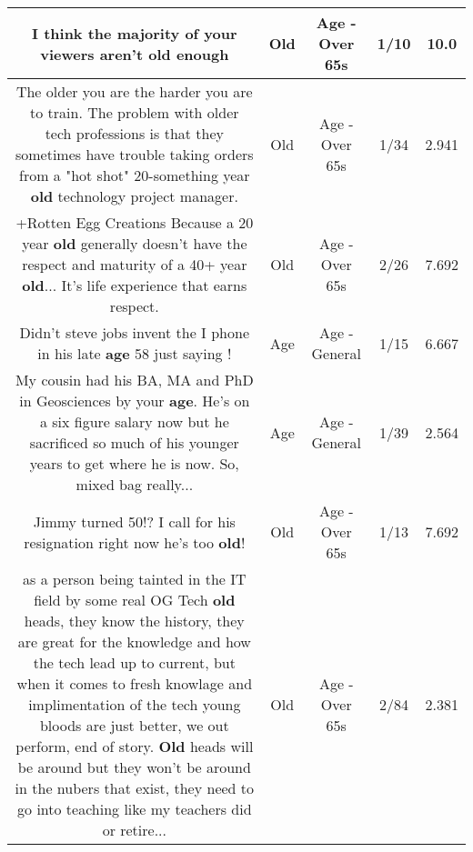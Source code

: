 \documentclass[11pt]{article}
\newlength\mylength
\begin{document}
\begin{center}
\begin{longtable}{|C{.65\mylength}|C{.30\mylength}|C{.12\mylength}|C{.12\mylength}|C{.12\mylength}|}
  \small I think the majority of your viewers aren't \textbf{old} enough\normalsize   & Old & Age - Over 65s & 1/10 & 10.0 \\  \hline
  \small The older you are the harder you are to train. The problem with older tech professions is that they sometimes have trouble taking orders from a "hot shot" 20-something year \textbf{old} technology project manager.\normalsize   & Old & Age - Over 65s & 1/34 & 2.941 \\  \hline
  \small +Rotten Egg Creations Because a 20 year \textbf{old} generally doesn't have the respect and maturity of a 40+ year \textbf{old}... It's life experience that earns respect.\normalsize   & Old & Age - Over 65s & 2/26 & 7.692 \\  \hline
  \small Didn't steve jobs invent the I phone in his late \textbf{age} 58 just saying !\normalsize   & Age & Age - General & 1/15 & 6.667 \\  \hline
  \small My cousin had his BA, MA and PhD in Geosciences by your \textbf{age}. He's on a six figure salary now but he sacrificed so much of his younger years to get where he is now. So, mixed bag really...\normalsize   & Age & Age - General & 1/39 & 2.564 \\  \hline
  \small Jimmy turned 50!? I call for his resignation right now he's too \textbf{old}!\normalsize   & Old & Age - Over 65s & 1/13 & 7.692 \\  \hline
  \small as a person being tainted in the IT field by some real OG Tech \textbf{old} heads, they know the history, they are great for the knowledge and how the tech lead up to current, but when it comes to fresh knowlage and implimentation of the tech young bloods are just better, we out perform, end of story. \textbf{Old} heads will be around but they won't be around in the nubers that exist, they need to go into teaching like my teachers did or retire...\normalsize   & Old & Age - Over 65s & 2/84 & 2.381 \\  \hline

\end{longtable}
\end{center}
\end{document}
